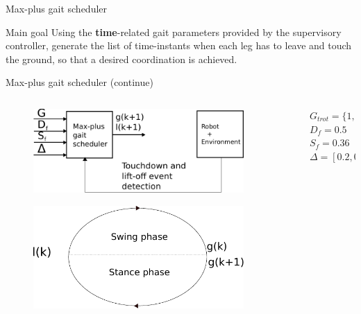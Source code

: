 \documentclass{beamer}
\begin{document}
\begin{frame}{Max-plus gait scheduler}
	\begin{block}{Main goal}
		\Large Using the \textbf{time}-related gait parameters provided by the supervisory controller, generate the list of time-instants when each leg has to leave and touch the ground, so that a desired coordination is achieved.
	\end{block}
\end{frame}

\begin{frame}{Max-plus gait scheduler (continue)}
\begin{columns}
\hspace{1cm}
\begin{column}{0.45\textwidth}
	\begin{figure}[ht]\centering
		\includegraphics[width=0.9\textwidth]{images/MaxPlus.pdf}
	\end{figure}
	\begin{figure}[ht]\centering
		\includegraphics[width=0.9\textwidth]{images/Phases.pdf}
	\end{figure}
\end{column}
\begin{column}{0.55\textwidth}
$G_{trot}=\{1,4\}\prec\{2,3\}$ \\
$D_f = 0.5$ \\
$S_f = 0.36$ \\
$\Delta = [0.2,0.2]$ 


\end{column}
\end{columns}
\end{frame}
\end{document}
